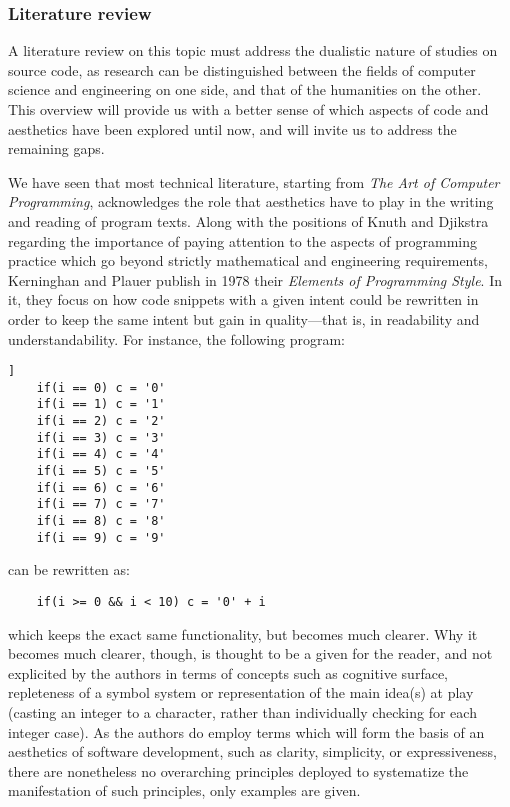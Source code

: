 \subsubsection{Literature review}


A literature review on this topic must address the dualistic nature of studies on source code, as research can be distinguished between the fields of computer science and engineering on one side, and that of the humanities on the other. This overview will provide us with a better sense of which aspects of code and aesthetics have been explored until now, and will invite us to address the remaining gaps.

We have seen that most technical literature, starting from \emph{The Art of Computer Programming}, acknowledges the role that aesthetics have to play in the writing and reading of program texts. Along with the positions of Knuth and Djikstra regarding the importance of paying attention to the aspects of programming practice\cite{dijkstra_chapter_1972} which go beyond strictly mathematical and engineering requirements, Kerninghan and Plauer publish in 1978 their \emph{Elements of Programming Style}\cite{kernighan_elements_1978}. In it, they focus on how code snippets with a given intent could be rewritten in order to keep the same intent but gain in quality—that is, in readability and understandability. For instance, the following program:

\begin{lstlisting}]
    if(i == 0) c = '0'
    if(i == 1) c = '1'
    if(i == 2) c = '2'
    if(i == 3) c = '3'
    if(i == 4) c = '4'
    if(i == 5) c = '5'
    if(i == 6) c = '6'
    if(i == 7) c = '7'
    if(i == 8) c = '8'
    if(i == 9) c = '9'
\end{lstlisting}

can be rewritten as:

\begin{lstlisting}
    if(i >= 0 && i < 10) c = '0' + i
\end{lstlisting}

which keeps the exact same functionality, but becomes much clearer. Why it becomes much clearer, though, is thought to be a given for the reader, and not explicited by the authors in terms of concepts such as cognitive surface, repleteness of a symbol system or representation of the main idea(s) at play (casting an integer to a character, rather than individually checking for each integer case). As the authors do employ terms which will form the basis of an aesthetics of software development, such as clarity, simplicity, or expressiveness, there are nonetheless no overarching principles deployed to systematize the manifestation of such principles, only examples are given.

